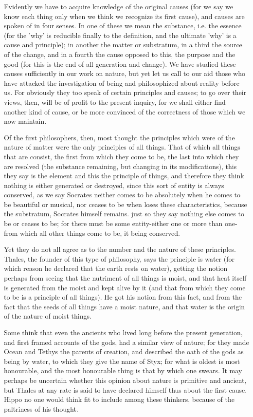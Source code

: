 \documentclass{article}
\begin{document}
Evidently we have to acquire knowledge of the original causes (for we say we know each thing only when we think we recognize its first cause), and causes are spoken of in four senses. In one of these we mean the substance, i.e. the essence (for the 'why' is reducible finally to the definition, and the ultimate 'why' is a cause and principle); in another the matter or substratum, in a third the source of the change, and in a fourth the cause opposed to this, the purpose and the good (for this is the end of all generation and change). We have studied these causes sufficiently in our work on nature, but yet let us call to our aid those who have attacked the investigation of being and philosophized about reality before us. For obviously they too speak of certain principles and causes; to go over their views, then, will be of profit to the present inquiry, for we shall either find another kind of cause, or be more convinced of the correctness of those which we now maintain.

Of the first philosophers, then, most thought the principles which were of the nature of matter were the only principles of all things. That of which all things that are consist, the first from which they come to be, the last into which they are resolved (the substance remaining, but changing in its modifications), this they say is the element and this the principle of things, and therefore they think nothing is either generated or destroyed, since this sort of entity is always conserved, as we say Socrates neither comes to be absolutely when he comes to be beautiful or musical, nor ceases to be when loses these characteristics, because the substratum, Socrates himself remains. just so they say nothing else comes to be or ceases to be; for there must be some entity-either one or more than one-from which all other things come to be, it being conserved.

Yet they do not all agree as to the number and the nature of these principles. Thales, the founder of this type of philosophy, says the principle is water (for which reason he declared that the earth rests on water), getting the notion perhaps from seeing that the nutriment of all things is moist, and that heat itself is generated from the moist and kept alive by it (and that from which they come to be is a principle of all things). He got his notion from this fact, and from the fact that the seeds of all things have a moist nature, and that water is the origin of the nature of moist things.

Some think that even the ancients who lived long before the present generation, and first framed accounts of the gods, had a similar view of nature; for they made Ocean and Tethys the parents of creation, and described the oath of the gods as being by water, to which they give the name of Styx; for what is oldest is most honourable, and the most honourable thing is that by which one swears. It may perhaps be uncertain whether this opinion about nature is primitive and ancient, but Thales at any rate is said to have declared himself thus about the first cause. Hippo no one would think fit to include among these thinkers, because of the paltriness of his thought.
\end{document}
